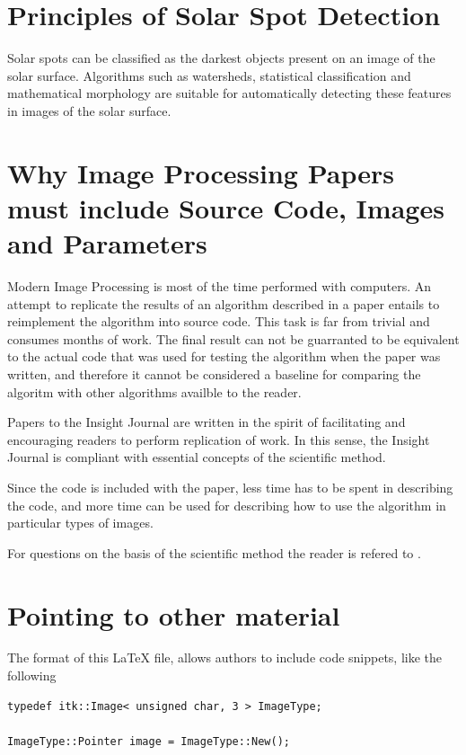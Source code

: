 \documentclass{InsightArticle}
\begin{document}
\section{Principles of Solar Spot Detection}

Solar spots can be classified as the darkest objects present on an image of the
solar surface. Algorithms such as watersheds, statistical classification and
mathematical morphology are suitable for automatically detecting these features
in images of the solar surface.


\section{Why Image Processing Papers must include Source Code, Images and Parameters }

Modern Image Processing is most of the time performed with computers. An
attempt to replicate the results of an algorithm described in a paper entails
to reimplement the algorithm into source code. This task is far from trivial
and consumes months of work. The final result can not be guarranted to be
equivalent to the actual code that was used for testing the algorithm when the
paper was written, and therefore it cannot be considered a baseline for
comparing the algoritm with other algorithms availble to the reader.

Papers to the Insight Journal are written in the spirit of facilitating and
encouraging readers to perform replication of work. In this sense, the Insight
Journal is compliant with essential concepts of the scientific method.

Since the code is included with the paper, less time has to be spent in
describing the code, and more time can be used for describing how to use the
algorithm in particular types of images.

For questions on the basis of the scientific method the reader is refered to
\cite{Popper2002,Popper1971}.



\section{Pointing to other material}

The format of this LaTeX file, allows authors to include code snippets, like
the following

\small
\begin{verbatim}
typedef itk::Image< unsigned char, 3 > ImageType;

ImageType::Pointer image = ImageType::New();
\end{verbatim}
\normalsize
\end{document}
